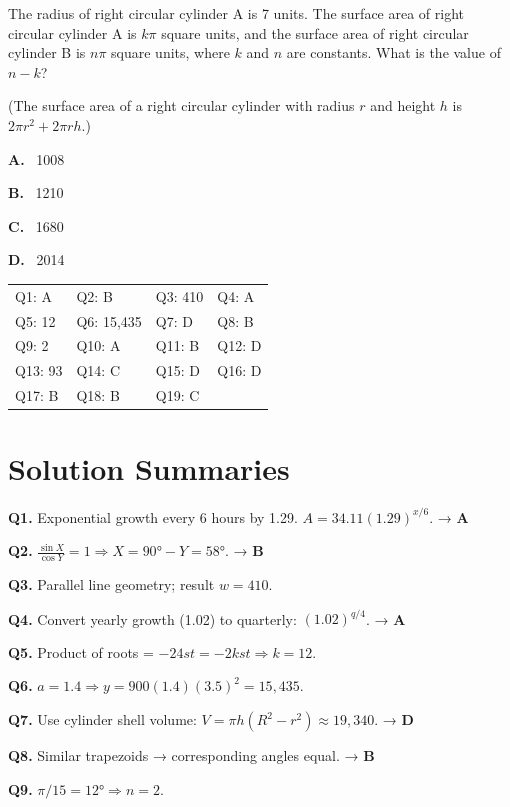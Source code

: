 \documentclass[12pt]{article}
\newcommand{\choicebox}[2]{%
  \begin{tcolorbox}[
    colback=white, 
    colframe=novelblue,
    boxrule=0.5pt, 
    rounded corners=4pt, 
    left=6pt, right=6pt, top=6pt, bottom=6pt,
    width=\linewidth
  ]
  \textbf{#1.} \ #2
  \end{tcolorbox}
}
\begin{document}
The radius of right circular cylinder A is 7 units.  
The surface area of right circular cylinder A is $k\pi$ square units, and the surface area of right circular cylinder B is $n\pi$ square units, where $k$ and $n$ are constants.  
What is the value of $n - k$?  

(The surface area of a right circular cylinder with radius $r$ and height $h$ is $2\pi r^2 + 2\pi rh$.)

\vspace{0.75em}

\choicebox{A}{1008}
\choicebox{B}{1210}
\choicebox{C}{1680}
\choicebox{D}{2014}

\vspace{5em}
\newpage
\begin{tabularx}{\textwidth}{@{}llll@{}}
\toprule
Q1: A & Q2: B & Q3: 410 & Q4: A \\
Q5: 12 & Q6: 15{,}435 & Q7: D & Q8: B \\
Q9: 2 & Q10: A & Q11: B & Q12: D \\
Q13: 93 & Q14: C & Q15: D & Q16: D \\
Q17: B & Q18: B & Q19: C &  \\
\bottomrule
\end{tabularx}

\vspace{1em}

\section*{Solution Summaries}

\textbf{Q1.} Exponential growth every 6 hours by 1.29.  
\(A = 34.11(1.29)^{x/6}\). → \textbf{A}

\textbf{Q2.} \(\frac{\sin X}{\cos Y} = 1 \Rightarrow X = 90° - Y = 58°.\) → \textbf{B}

\textbf{Q3.} Parallel line geometry; result \(w = 410.\)

\textbf{Q4.} Convert yearly growth (1.02) to quarterly: \((1.02)^{q/4}\). → \textbf{A}

\textbf{Q5.} Product of roots = \(-24st = -2kst \Rightarrow k=12.\)

\textbf{Q6.} \(a=1.4 \Rightarrow y=900(1.4)(3.5)^2=15{,}435.\)

\textbf{Q7.} Use cylinder shell volume: \(V = \pi h(R^2-r^2) \approx 19{,}340.\) → \textbf{D}

\textbf{Q8.} Similar trapezoids → corresponding angles equal. → \textbf{B}

\textbf{Q9.} \(\pi/15 = 12° \Rightarrow n=2.\)
\end{document}
